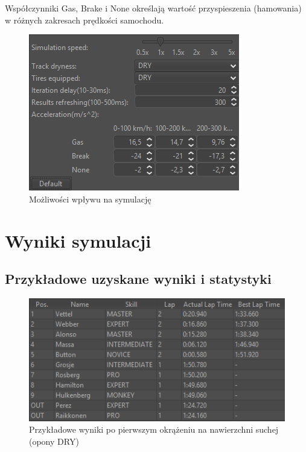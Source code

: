 \documentclass{article}
\begin{document}
Współczynniki Gas, Brake i None określają wartość przyspieszenia (hamowania) w różnych zakresach prędkości samochodu.\\
\pagebreak
\begin{figure}[h]
\begin{center}
\includegraphics[scale=0.8]{options.png}
\caption{Możliwości wpływu na symulację}
\end{center}
\end{figure}


\section{Wyniki symulacji}
\subsection{Przykładowe uzyskane wyniki i statystyki}

\begin{figure}[h]
\begin{center}
\includegraphics[scale=0.8]{results.png}
\caption{Przykładowe wyniki po pierwszym okrążeniu na nawierzchni suchej (opony DRY)}
\end{center}
\end{figure}

\pagebreak
\end{document}

